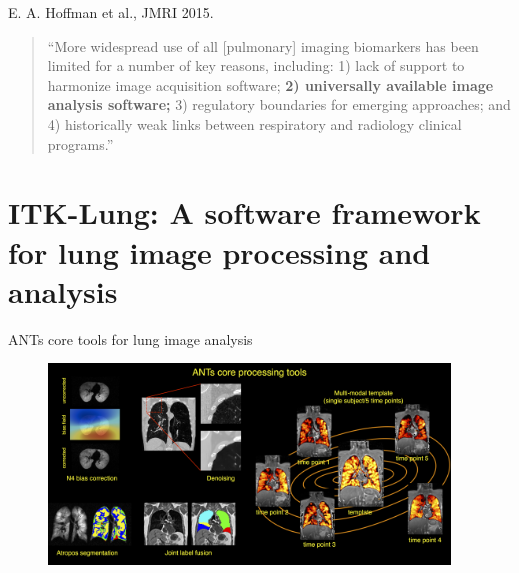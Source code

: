 \documentclass[ignorenonframetext,]{beamer}
\begin{document}
\begin{frame}{E. A. Hoffman et al., JMRI 2015.}

\begin{quote}
``More widespread use of all {[}pulmonary{]} imaging biomarkers has been
limited for a number of key reasons, including: 1) lack of support to
harmonize image acquisition software; \textbf{2) universally available
image analysis software;} 3) regulatory boundaries for emerging
approaches; and 4) historically weak links between respiratory and
radiology clinical programs.''
\end{quote}

\end{frame}

\section{ITK-Lung: A software framework for lung image processing and
analysis}\label{itk-lung-a-software-framework-for-lung-image-processing-and-analysis}

\begin{frame}{ANTs core tools for lung image analysis}

\centering

\begin{figure}
\includegraphics[width=0.95\textwidth]{./lung/figures/coreANtsToolsLung.png}
\end{figure}

\end{frame}
\end{document}
